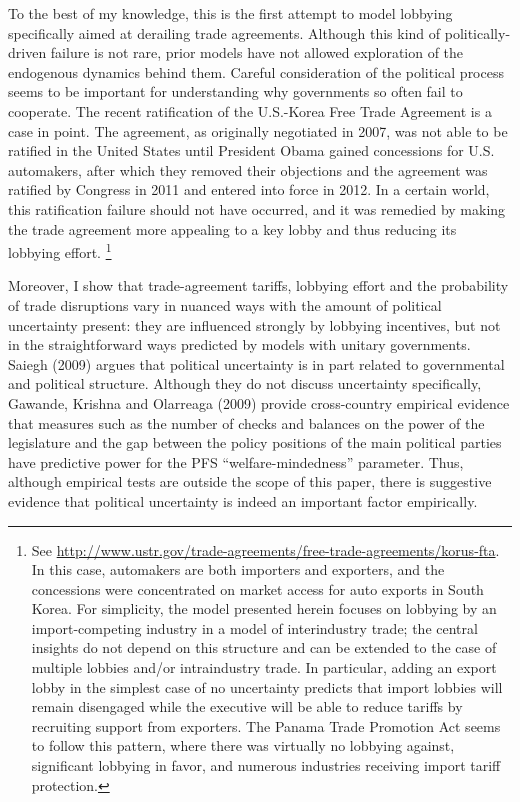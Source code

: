 \documentclass[10pt]{article}
\begin{document}
To the best of my knowledge, this is the first attempt to model lobbying specifically aimed at derailing trade agreements. Although this kind of politically-driven failure is not rare, prior models have not allowed exploration of the endogenous dynamics behind them. Careful consideration of the political process seems to be important for understanding why governments so often fail to cooperate. The recent ratification of the U.S.-Korea Free Trade Agreement is a case in point. The agreement, as originally negotiated in 2007, was not able to be ratified in the United States until President Obama gained concessions for U.S. automakers, after which they removed their objections and the agreement was ratified by Congress in 2011 and entered into force in 2012. In a certain world, this ratification failure should not have occurred, and it was remedied by making the trade agreement more appealing to a key lobby and thus reducing its lobbying effort. \footnote{See \url{http://www.ustr.gov/trade-agreements/free-trade-agreements/korus-fta}. In this case, automakers are both importers and exporters, and the concessions were concentrated on market access for auto exports in South Korea. For simplicity, the model presented herein focuses on lobbying by an import-competing industry in a model of interindustry trade; the central insights do not depend on this structure and can be extended to the case of multiple lobbies and/or intraindustry trade. In particular, adding an export lobby in the simplest case of no uncertainty predicts that import lobbies will remain disengaged while the executive will be able to reduce tariffs by recruiting support from exporters. The Panama Trade Promotion Act seems to follow this pattern, where there was virtually no lobbying against, significant lobbying in favor, and numerous industries receiving import tariff protection.\label{fn:lobby}}

Moreover, I show that trade-agreement tariffs, lobbying effort and the probability of trade disruptions vary in nuanced ways with the amount of political uncertainty present: they are influenced strongly by lobbying incentives, but not in the straightforward ways predicted by models with unitary governments. Saiegh (2009) argues that political uncertainty is in part related to governmental and political structure. Although they do not discuss uncertainty specifically, Gawande, Krishna and Olarreaga (2009) provide cross-country empirical evidence that measures such as the number of checks and balances on the power of the legislature and the gap between the policy positions of the main political parties have predictive power for the PFS ``welfare-mindedness'' parameter. Thus, although empirical tests are outside the scope of this paper, there is suggestive evidence that political uncertainty is indeed an important factor empirically.
\end{document}
